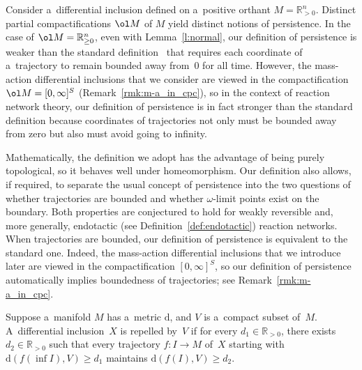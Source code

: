 \begin{Remark}
\label{rmk:def_pers}
Consider a~dif\/ferential inclusion def\/ined on a~positive orthant $M=\mathbb{R}_{>0}^n$.
Distinct partial compactif\/ications $\ol M$ of $M$ yield distinct notions of persistence.
In the case of $\ol M=\mathbb{R}_{\geq 0}^n$, even with Lemma~\ref{l:normal}, our def\/inition of persistence is weaker
than the standard def\/inition~\cite{Freed} that requires each coordinate of a~trajectory to remain bounded away
from~$0$ for all time.
However, the mass-action dif\/ferential inclusions that we consider are viewed in the compactif\/ication $\ol
M=[0,\infty]^S$ (Remark~\ref{rmk:m-a_in_cpc}), so in the context of reaction network theory, our def\/inition of
persistence is in fact stronger than the standard def\/inition because coordinates of trajectories not only must be
bounded away from zero but also must avoid going to inf\/inity.

Mathematically, the def\/inition we adopt has the advantage of being purely topological, so it behaves well under
homeomorphism.
Our def\/inition also allows, if required, to separate the usual concept of persistence into the two questions of
whether trajectories are bounded and whether $\omega$-limit points exist on the boundary.
Both properties are conjectured to hold for weakly reversible and, more generally, endotactic (see
Def\/inition~\ref{def:endotactic}) reaction networks.
When trajectories are bounded, our def\/inition of persistence is equivalent to the standard one.
Indeed, the mass-action dif\/ferential inclusions that we introduce later are viewed in the compactif\/ication
$[0,\infty]^{S}$, so our def\/inition of persistence automatically implies boundedness of trajectories; see
Remark~\ref{rmk:m-a_in_cpc}.
\end{Remark}

\begin{Remark}
\label{rmk:repel_dist}
Suppose a~manifold $M$ has a~metric $\mathrm{d}$, and $V$ is a~compact subset of~$M$.
A~dif\/ferential inclusion~$X$ is repelled by~$V$ if for every $d_1\in\mathbb{R}_{>0}$, there exists
$d_2\in\mathbb{R}_{>0}$ such that every trajectory $f:I\to M$ of~$X$ starting with $\mathrm{d}(f(\inf{I}),V)\geq d_1$
maintains $\mathrm{d}(f(I),V)\geq d_2$.
\end{Remark}

